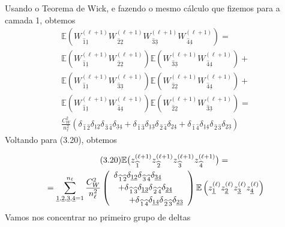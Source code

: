 \documentclass{beamer}
\newcommand{\EE}{\mathbb{E}}
\def\mi#1{{\,\widehat{#1}}}
\def\mj#1{\underline{#1}}
\def\eell{{(\ell)}}
\def\eellum{{(\ell+1)}}
\begin{document}
\begin{frame}
	Usando o Teorema de Wick, e fazendo o mesmo cálculo que fizemos para a camada 1, obtemos
	\begin{multline*}
		\EE\left(W^\eellum_{\mi1\mj1}W^\eellum_{\mi2\mj2}W^\eellum_{\mi3\mj3}W^\eellum_{\mi4\mj4} \right) = \\
		\EE\left(W^\eellum_{\mi1\mj1}W^\eellum_{\mi2\mj2}\right)\EE\left(W^\eellum_{\mi3\mj3}W^\eellum_{\mi4\mj4}\right) + \\
		\EE\left(W^\eellum_{\mi1\mj1}W^\eellum_{\mi3\mj3}\right)\EE\left(W^\eellum_{\mi2\mj2}W^\eellum_{\mi4\mj4}\right) + \\
		\EE\left(W^\eellum_{\mi1\mj1}W^\eellum_{\mi4\mj4}\right)\EE\left(W^\eellum_{\mi2\mj2}W^\eellum_{\mi3\mj3}\right) = \\
		\frac{C_W^2}{n_\ell^2}\left(\delta_{\mi1\mi2}\delta_{\mj1\mj2}\delta_{\mi3\mi4}\delta_{\mj3\mj4} + \delta_{\mi1\mi3}\delta_{\mj1\mj3} \delta_{\mi2\mi4}\delta_{\mj2\mj4} + \delta_{\mi1\mi4}\delta_{\mj1\mj4} \delta_{\mi2\mi3}\delta_{\mj2\mj3}\right)
	\end{multline*}
	Voltando para (3.20), obtemos
\end{frame}

\begin{frame}
	\begin{multline*}\tag{3.20}\EE\big(z^\eellum_{\mi1} z^\eellum_{\mi2} z^\eellum_{\mi3} z^\eellum_{\mi4}\big) = \\
		= \sum_{\mj1,\mj2,\mj3,\mj4=1}^{n_\ell}\frac{C_W^2}{n_\ell^2}\left(\begin{array}{r}
			\delta_{\mi1\mi2}\delta_{\mj1\mj2}\delta_{\mi3\mi4}\delta_{\mj3\mj4} \hspace{6ex} \\[1mm] 
			+\delta_{\mi1\mi3}\delta_{\mj1\mj3} \delta_{\mi2\mi4}\delta_{\mj2\mj4} \hspace{3ex} \\[1mm]
			+  \delta_{\mi1\mi4}\delta_{\mj1\mj4} \delta_{\mi2\mi3}\delta_{\mj2\mj3}
		\end{array}\right)\EE\left( z^\eell_{\mj1}z^\eell_{\mj2}z^\eell_{\mj3}z^\eell_{\mj4}\right)
	\end{multline*}
	Vamos nos concentrar no  primeiro grupo de deltas
\end{frame}
\end{document}
